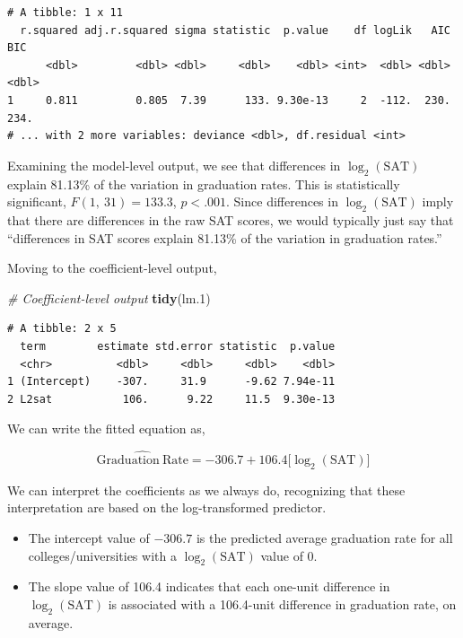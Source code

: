 \documentclass[]{book}
\newenvironment{Shaded}{\begin{snugshade}}{\end{snugshade}}
\newcommand{\CommentTok}[1]{\textcolor[rgb]{0.56,0.35,0.01}{\textit{#1}}}
\newcommand{\FloatTok}[1]{\textcolor[rgb]{0.00,0.00,0.81}{#1}}
\newcommand{\KeywordTok}[1]{\textcolor[rgb]{0.13,0.29,0.53}{\textbf{#1}}}
\newcommand{\NormalTok}[1]{#1}
\providecommand{\tightlist}{%
  \setlength{\itemsep}{0pt}\setlength{\parskip}{0pt}}
\begin{document}
\begin{verbatim}
# A tibble: 1 x 11
  r.squared adj.r.squared sigma statistic  p.value    df logLik   AIC   BIC
      <dbl>         <dbl> <dbl>     <dbl>    <dbl> <int>  <dbl> <dbl> <dbl>
1     0.811         0.805  7.39      133. 9.30e-13     2  -112.  230.  234.
# ... with 2 more variables: deviance <dbl>, df.residual <int>
\end{verbatim}

Examining the model-level output, we see that differences in \(\log_2(\mathrm{SAT})\) explain 81.13\% of the variation in graduation rates. This is statistically significant, \(F(1,~31)=133.3\), \(p<.001\). Since differences in \(\log_2(\mathrm{SAT})\) imply that there are differences in the raw SAT scores, we would typically just say that ``differences in SAT scores explain 81.13\% of the variation in graduation rates.''

Moving to the coefficient-level output,

\begin{Shaded}
\begin{Highlighting}[]
\CommentTok{# Coefficient-level output}
\KeywordTok{tidy}\NormalTok{(lm}\FloatTok{.1}\NormalTok{)}
\end{Highlighting}
\end{Shaded}

\begin{verbatim}
# A tibble: 2 x 5
  term        estimate std.error statistic  p.value
  <chr>          <dbl>     <dbl>     <dbl>    <dbl>
1 (Intercept)    -307.     31.9      -9.62 7.94e-11
2 L2sat           106.      9.22     11.5  9.30e-13
\end{verbatim}

We can write the fitted equation as,

\[
\hat{\mathrm{Graduation~Rate}} = -306.7 + 106.4\bigg[\log_2(\mathrm{SAT})\bigg]
\]

We can interpret the coefficients as we always do, recognizing that these interpretation are based on the log-transformed predictor.

\begin{itemize}
\tightlist
\item
  The intercept value of \(-306.7\) is the predicted average graduation rate for all colleges/universities with a \(\log_2(\mathrm{SAT})\) value of 0.
\item
  The slope value of 106.4 indicates that each one-unit difference in \(\log_2(\mathrm{SAT})\) is associated with a 106.4-unit difference in graduation rate, on average.
\end{itemize}
\end{document}
